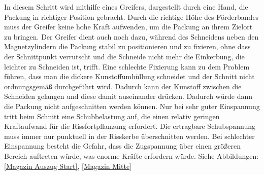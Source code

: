 In diesem Schritt wird mithilfe eines Greifers, dargestellt durch eine Hand, die Packung in richtiger Position gebracht.
Durch die richtige Höhe des Förderbandes muss der Greifer keine hohe Kraft aufwenden, um die Packung an ihrem Zielort zu bringen. Der Greifer dient auch noch dazu, während des Schneidens neben den Magnetzylindern die Packung stabil zu positionieren und zu fixieren, ohne dass der Schnittpunkt verrutscht und die Schneide nicht mehr die Einkerbung, die leichter zu Schneiden ist, trifft. Eine schlechte Fixierung kann zu dem Problem führen, dass man die dickere Kunstoffumhüllung schneidet und der Schnitt nicht ordnungsgemäß durchgeführt wird. Dadurch kann der Kunstoff zwischen die Schneiden gelangen und diese damit auseinander drücken. Dadurch würde dann die Packung nicht aufgeschnitten werden können. Nur bei sehr guter Einspannung tritt beim Schnitt eine Schubbelastung auf, die einen relativ geringen Kraftaufwand für die Rissfortpflanzung erfordert. Die ertragbare Schubspannung muss immer nur punktuell in der Risskerbe überschnitten werden. Bei schlechter Einspannung besteht die Gefahr, dass die Zugspannung über einen größeren Bereich auftreten würde, was enorme Kräfte erfordern würde. Siehe Abbildungen: \ref{Magazin Auszug Start}, \ref{Magazin Mitte}

